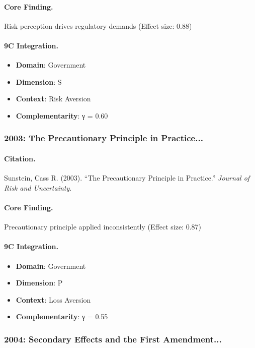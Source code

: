 \paragraph{Core Finding.}
Risk perception drives regulatory demands (Effect size: 0.88)

\paragraph{9C Integration.}
\begin{itemize}[nosep]
  \item \textbf{Domain}: Government
  \item \textbf{Dimension}: S
  \item \textbf{Context}: Risk Aversion
  \item \textbf{Complementarity}: γ = 0.60
\end{itemize}

\subsubsection{2003: The Precautionary Principle in Practice...}

\paragraph{Citation.}
Sunstein, Cass R. (2003). ``The Precautionary Principle in Practice.''
\textit{Journal of Risk and Uncertainty}.

\paragraph{Core Finding.}
Precautionary principle applied inconsistently (Effect size: 0.87)

\paragraph{9C Integration.}
\begin{itemize}[nosep]
  \item \textbf{Domain}: Government
  \item \textbf{Dimension}: P
  \item \textbf{Context}: Loss Aversion
  \item \textbf{Complementarity}: γ = 0.55
\end{itemize}

\subsubsection{2004: Secondary Effects and the First Amendment...}

